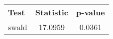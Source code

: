 \begin{tabular}{lcc}
\toprule
Test  & Statistic & p-value \\
\midrule
swald  & 17.0959 & 0.0361 \\
\bottomrule
\end{tabular}%

